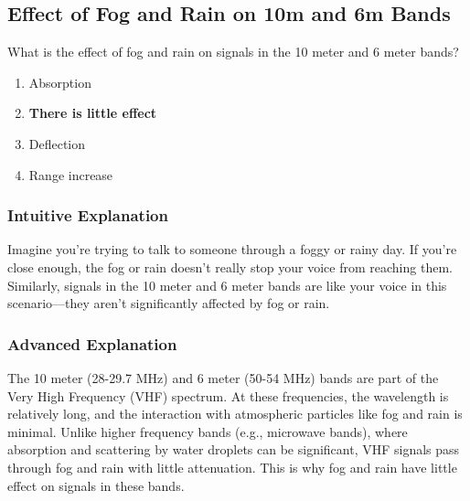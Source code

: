 \subsection{Effect of Fog and Rain on 10m and 6m Bands}
\label{T3A12}

\begin{tcolorbox}[colback=gray!10!white,colframe=black!75!black,title=T3A12]
What is the effect of fog and rain on signals in the 10 meter and 6 meter bands?
\begin{enumerate}[noitemsep]
    \item Absorption
    \item \textbf{There is little effect}
    \item Deflection
    \item Range increase
\end{enumerate}
\end{tcolorbox}

\subsubsection*{Intuitive Explanation}
Imagine you're trying to talk to someone through a foggy or rainy day. If you're close enough, the fog or rain doesn't really stop your voice from reaching them. Similarly, signals in the 10 meter and 6 meter bands are like your voice in this scenario—they aren't significantly affected by fog or rain.

\subsubsection*{Advanced Explanation}
The 10 meter (28-29.7 MHz) and 6 meter (50-54 MHz) bands are part of the Very High Frequency (VHF) spectrum. At these frequencies, the wavelength is relatively long, and the interaction with atmospheric particles like fog and rain is minimal. Unlike higher frequency bands (e.g., microwave bands), where absorption and scattering by water droplets can be significant, VHF signals pass through fog and rain with little attenuation. This is why fog and rain have little effect on signals in these bands.